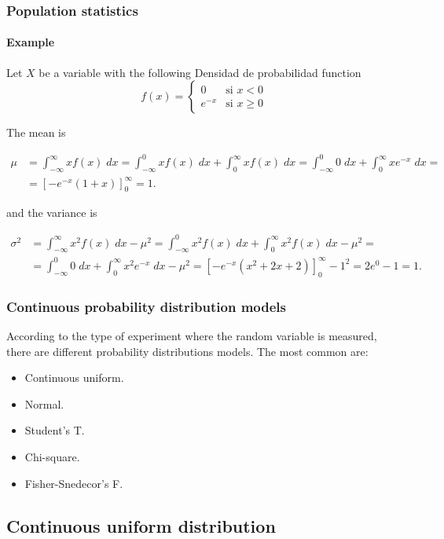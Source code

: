 \begin{frame}
\frametitle{Population statistics}
\framesubtitle{Example}
Let $X$ be a variable with the following Densidad de probabilidad function
\[
f(x) =
\begin{cases}
0 & \mbox{si $x<0$}\\
e^{-x} & \mbox{si $x\geq 0$}
\end{cases}
\]

The mean is 

\begin{align*}
\mu &= \int_{-\infty}^\infty xf(x)\;dx = \int_{-\infty}^0 xf(x)\;dx +\int_0^\infty xf(x)\;dx = \int_{-\infty}^0 0\;dx +\int_0^\infty xe^{-x}\;dx =\\
&= \left[-e^{-x}(1+x)\right]_0^{\infty} = 1.
\end{align*}

and the variance is

\begin{align*}
\sigma^2 &= \int_{-\infty}^\infty x^2f(x)\;dx -\mu^2 = \int_{-\infty}^0 x^2f(x)\;dx +\int_0^\infty x^2f(x)\;dx -\mu^2 = \\
&= \int_{-\infty}^0 0\;dx +\int_0^\infty x^2e^{-x}\;dx -\mu^2= \left[-e^{-x}(x^2+2x+2)\right]_0^{\infty} - 1^2= 2e^0-1 = 1.
\end{align*}

\end{frame}



\begin{frame}
\frametitle{Continuous probability distribution models}
According to the type of experiment where the random variable is measured, there are different probability distributions models. 
The most common are:
\begin{itemize}
\item Continuous uniform.
\item Normal.
\item Student's T.
\item Chi-square.
\item Fisher-Snedecor's F.
\end{itemize}
\end{frame}


\subsection{Continuous uniform distribution}


